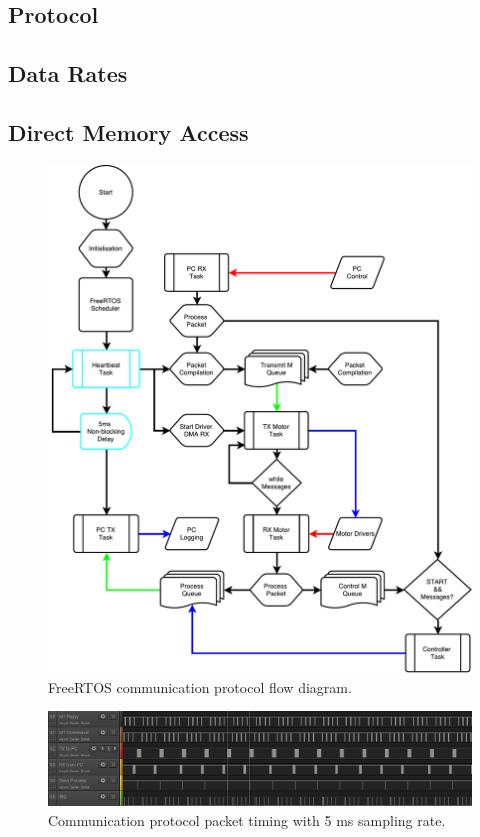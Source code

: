 \subsection{Protocol}
\subsection{Data Rates}
\subsection{Direct Memory Access}


\begin{figure}
\centering
\includegraphics[width=1\textwidth]{images/comms/communication-flow-diagram.pdf} 
\caption{FreeRTOS communication protocol flow diagram.}
\label{fig:FreeRTOS communication protocol flow diagram.}
\end{figure}

\begin{figure}
\centering
\includegraphics[width=1\textwidth]{images/comms/pc-packet-timing-data} 
\caption{Communication protocol packet timing with 5 ms sampling rate.}
\label{fig:packet-timing}
\end{figure}

